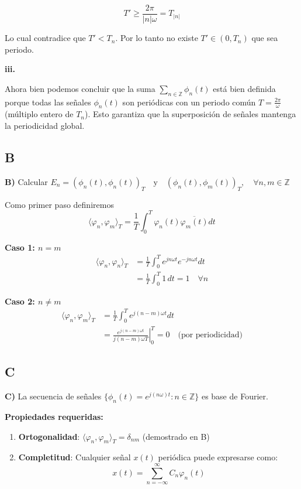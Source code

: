 $$T' \ge \dfrac{2\pi}{|n|\omega} = T_{|n|}$$

Lo cual contradice que $T'<T_n$. Por lo tanto no existe $T'\in(0,T_n)$ que sea periodo.

\textbf{iii.}

Ahora bien podemos concluir que la suma $\sum_{n \in \mathbb{Z}} \phi_n(t)$ está bien definida porque todas las señales $\phi_n(t)$ son periódicas con un periodo común $T = \frac{2\pi}{\omega}$ (múltiplo entero de $T_n$). Esto garantiza que la superposición de señales mantenga la periodicidad global.

\vspace{0.5cm}

\subsection{B}

\textbf{B)} Calcular $E_n = (\phi_n(t), \phi_n(t))_T \quad \text{y} \quad (\phi_n(t), \phi_m(t))_T, \quad \forall n,m \in \mathbb{Z}$

Como primer paso definiremos
\[
\langle \varphi_n, \varphi_m \rangle_T = \frac{1}{T}\int_0^T \varphi_n(t)\overline{\varphi_m(t)}dt
\]

\textbf{Caso 1: $n = m$}
\begin{align*}
\langle \varphi_n, \varphi_n \rangle_T &= \frac{1}{T}\int_0^T e^{jn\omega t}e^{-jn\omega t}dt \\
&= \frac{1}{T}\int_0^T 1\,dt = 1 \quad \forall n
\end{align*}

\textbf{Caso 2: $n \neq m$}
\begin{align*}
\langle \varphi_n, \varphi_m \rangle_T &= \frac{1}{T}\int_0^T e^{j(n-m)\omega t}dt \\
&= \left.\frac{e^{j(n-m)\omega t}}{j(n-m)\omega T}\right|_0^T = 0 \quad \text{(por periodicidad)}
\end{align*}

\vspace{0.5cm}

\subsection{C}

\textbf{C)} La secuencia de señales $\{ \phi_n(t) = e^{j(n\omega)t} : n \in \mathbb{Z} \}$ es base de Fourier.

\textbf{Propiedades requeridas:}
\begin{enumerate}[label=(\roman*)]
\item \textbf{Ortogonalidad}: $\langle \varphi_n, \varphi_m \rangle_T = \delta_{nm}$ (demostrado en B)
\item \textbf{Completitud}: Cualquier señal $x(t)$ periódica puede expresarse como:
\[
x(t) = \sum_{n=-\infty}^{\infty} C_n \varphi_n(t)
\]
\end{enumerate}

